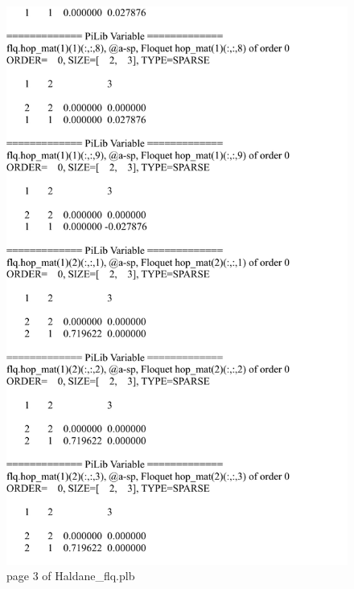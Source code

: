 \documentclass[10pt,a4paper]{article}
\begin{document}
\begin{figure}[tbp]
\centering
\includegraphics[width=0.85\columnwidth]{Haldane_flq_p3.pdf}
\caption{page 3 of Haldane\_flq.plb}
\end{figure}
\end{document}
